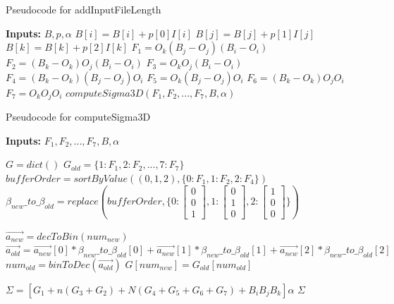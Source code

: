 \documentclass[conference]{IEEEtran}
\begin{document}
  \begin{algorithm}[h]
    \caption{Pseudocode for addInputFileLength}

    \begin{algorithmic}

    \STATE \textbf{Inputs:} $B, p, \alpha$
    \STATE $B[i] = B[i] + p[0]I[i]$
    \STATE $B[j] = B[j] + p[1]I[j]$
    \STATE $B[k] = B[k] + p[2]I[k]$
    \STATE $F_1 = O_k (B_j - O_j) (B_i - O_i)$
    \STATE $F_2 = (B_k - O_k) O_j (B_i - O_i)$
    \STATE $F_3 = O_k O_j (B_i-O_i)$
    \STATE $F_4 = (B_k-O_k) (B_j-O_j) O_i$
    \STATE $F_5 = O_k (B_j-O_j) O_i$
    \STATE $F_6 = (B_k - O_k) O_j O_i$
    \STATE $F_7 = O_k O_j O_i$
    \RETURN $computeSigma3D(F_1, F_2, ..., F_7, B, \alpha)$ %

    \end{algorithmic}
    \label{algo:addInputFileLength}
  \end{algorithm}

  \begin{algorithm}[h]
    \caption{Pseudocode for computeSigma3D}

    \begin{algorithmic}
    \STATE \textbf{Inputs:} $F_1, F_2, ..., F_7, B, \alpha$

    \STATE $G = dict()$
    \STATE $G_{old} = \{ 1: F_1, 2: F_2,..., 7: F_7\}$
    \STATE $bufferOrder = sortByValue((0,1,2), \{ 0:F_1, 1:F_2, 2:F_4\})$ %
    \STATE $\beta_{new}\_to\_\beta_{old} = replace(bufferOrder, \{
      0:\begin{bmatrix} 0 \\ 0 \\ 1 \end{bmatrix},
      1:\begin{bmatrix} 0 \\ 1 \\ 0 \end{bmatrix},
      2:\begin{bmatrix} 1 \\ 0 \\ 0 \end{bmatrix}
    \} )$ %

      \STATE $\vec{a_{new}} = decToBin(num_{new})$ %
      \STATE $\vec{a_{old}} = \vec{a_{new}}[0] * \beta_{new}\_to\_\beta_{old}[0]
        + \vec{a_{new}}[1] * \beta_{new}\_to\_\beta_{old}[1]
        + \vec{a_{new}}[2] * \beta_{new}\_to\_\beta_{old}[2]$
      \STATE $num_{old} = binToDec(\vec{a_{old}})$
      \STATE $G[num_{new}] = G_{old}[num_{old}]$
    \ENDFOR

    \STATE $\Sigma = [G_1 + n(G_3 + G_2) + N(G_4 + G_5 + G_6 + G_7) + B_iB_jB_k]\alpha$
    \RETURN $\Sigma$
    \end{algorithmic}
    \label{algo:computeSigma3D}
  \end{algorithm}
\end{document}
